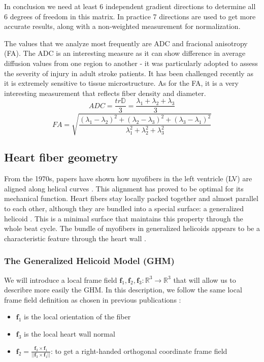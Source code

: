 In conclusion we need at least 6 independent gradient directions to determine all 6 degrees of freedom in this matrix. In practice 7 directions are used to get more accurate results, along with a non-weighted measurement for normalization.

The values that we analyze most frequently are ADC and fracional anisotropy (FA). The ADC is an interesting measure as it can show difference in average diffusion values from one region to another - it was particularly adopted to assess the severity of injury in adult stroke patients. It has been challenged recently as it is extremely sensitive to tissue microstructure. As for the FA, it is a very interesting measurement that reflects fiber density and diameter.
\begin{equation}
    ADC = \frac{tr{\mathbb{D}}}{3} = \frac{\lambda_1 + \lambda_2 + \lambda_3}{3}
\end{equation}
\begin{equation}
    FA = \sqrt{\frac{(\lambda_1 - \lambda_2)^2 + (\lambda_2 - \lambda_3)^2 + (\lambda_3 - \lambda_1)^2}{\lambda_1^2 + \lambda_2^2 + \lambda_3^2}}
\end{equation}

\subsection{Heart fiber geometry}

From the 1970s, papers have shown how myofibers in the left ventricle (LV) are aligned along helical curves \cite{savadjiev2012heart}. This alignment has proved to be optimal for its mechanical function. Heart fibers stay locally packed together and almost parallel to each other, although they are bundled into a special surface: a generalized helicoid \cite{blair1978generalization}. This is a minimal surface that maintains this property through the whole beat cycle. The bundle of myofibers in generalized helicoids appears to be a characteristic feature through the heart wall \cite{pami2015, savadjiev2012heart}.

\subsubsection{The Generalized Helicoid Model (GHM)}

We will introduce a local frame field $\mathbf{f}_1,\mathbf{f}_2,\mathbf{f}_3 : \mathbb{R}^3 \to \mathbb{R}^3$ that will allow us to describre more easily the GHM. In this description, we follow the same local frame field definition as chosen in previous publications \cite{pami2015, savadjiev2012heart}:
\begin{itemize}
    \item $\mathbf{f}_1$ is the local orientation of the fiber
    \item $\mathbf{f}_3$ is the local heart wall normal
    \item $\mathbf{f}_2 = \frac{\mathbf{f}_3 \times \mathbf{f}_1}{||\mathbf{f}_3 \times \mathbf{f}_1||}$: to get a right-handed orthogonal coordinate frame field
\end{itemize}

